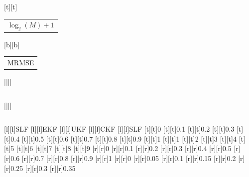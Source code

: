 %    
%
%
\begin{psfrags}%
\psfragscanon%
%
[t][t]{\color[rgb]{0,0,0}\setlength{\tabcolsep}{0pt}\begin{tabular}{c}$\log_2 (M) + 1$\end{tabular}}%
[b][b]{\color[rgb]{0,0,0}\setlength{\tabcolsep}{0pt}\begin{tabular}{c}MRMSE\end{tabular}}%
[][]{\color[rgb]{0,0,0}\setlength{\tabcolsep}{0pt}\begin{tabular}{c} \end{tabular}}%
[][]{\color[rgb]{0,0,0}\setlength{\tabcolsep}{0pt}\begin{tabular}{c} \end{tabular}}%
[l][l]{\color[rgb]{0,0,0}SLF}%
[l][l]{\color[rgb]{0,0,0}EKF}%
[l][l]{\color[rgb]{0,0,0}UKF}%
[l][l]{\color[rgb]{0,0,0}CKF}%
[l][l]{\color[rgb]{0,0,0}SLF}%
%
[t][t]{0}%
[t][t]{0.1}%
[t][t]{0.2}%
[t][t]{0.3}%
[t][t]{0.4}%
[t][t]{0.5}%
[t][t]{0.6}%
[t][t]{0.7}%
[t][t]{0.8}%
[t][t]{0.9}%
[t][t]{1}%
[t][t]{1}%
[t][t]{2}%
[t][t]{3}%
[t][t]{4}%
[t][t]{5}%
[t][t]{6}%
[t][t]{7}%
[t][t]{8}%
[t][t]{9}%
%
[r][r]{0}%
[r][r]{0.1}%
[r][r]{0.2}%
[r][r]{0.3}%
[r][r]{0.4}%
[r][r]{0.5}%
[r][r]{0.6}%
[r][r]{0.7}%
[r][r]{0.8}%
[r][r]{0.9}%
[r][r]{1}%
[r][r]{0}%
[r][r]{0.05}%
[r][r]{0.1}%
[r][r]{0.15}%
[r][r]{0.2}%
[r][r]{0.25}%
[r][r]{0.3}%
[r][r]{0.35}%

\end{psfrags}
